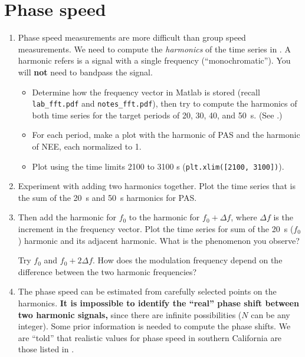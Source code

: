 \documentclass[11pt,titlepage,fleqn]{article}
\begin{document}

\section{Phase speed}

\begin{enumerate}

\item Phase speed measurements are more difficult than group speed measurements. We need to compute the {\em harmonics} of the time series in . A harmonic refers is a signal with a single frequency (``monochromatic'').
You will {\bf not} need to bandpass the signal.
%
\begin{itemize}
\item Determine how the frequency vector in Matlab is stored (recall \verb+lab_fft.pdf+ and \verb+notes_fft.pdf+), then try to compute the harmonics of both time series for the target periods of 20, 30, 40, and 50~s. (See .)
\item For each period, make a plot with the harmonic of PAS and the harmonic of NEE, each normalized to 1.
\item Plot using the time limits 2100 to 3100 s (\verb+plt.xlim([2100, 3100])+).
\end{itemize}

\item Experiment with adding two harmonics together. Plot the time series that is the sum of the 20~s and 50~s harmonics for PAS.

\item Then add the harmonic for $f_0$ to the harmonic for $f_0 + \Delta f$, where $\Delta f$ is the increment in the frequency vector. Plot the time series for sum of the 20~s ($f_0$) harmonic and its adjacent harmonic. What is the phenomenon you observe?

Try $f_0$ and $f_0 + 2\Delta f$. How does the modulation frequency depend on the difference between the two harmonic frequencies?

\item The phase speed can be estimated from carefully selected points on the harmonics. {\bf It is impossible to identify the ``real'' phase shift between two harmonic signals,} since there are infinite possibilities ($N$ can be any integer). Some prior information is needed to compute the phase shifts. We are ``told'' that realistic values for phase speed in southern California are those listed in .


\end{enumerate}
\end{document}
